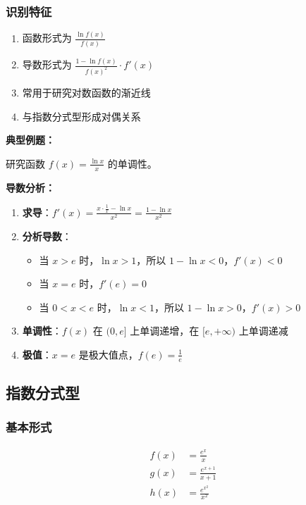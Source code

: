 \documentclass[a4paper,11pt]{ctexrep}
\newcommand{\exampleicon}{\ModeBadge[highlight]{例题}}
\newcommand{\analysisicon}{\ModeBadge[secondary]{分析}}
\theoremstyle{definition}
\begin{document}
\subsubsection{识别特征}

\begin{tipbox}[对数分式型识别要点]
\begin{enumerate}
    \item 函数形式为 $\frac{\ln f(x)}{f(x)}$
    \item 导数形式为 $\frac{1 - \ln f(x)}{f(x)^2} \cdot f'(x)$
    \item 常用于研究对数函数的渐近线
    \item 与指数分式型形成对偶关系
\end{enumerate}
\end{tipbox}

\exampleicon \textbf{典型例题：}

研究函数 $f(x) = \frac{\ln x}{x}$ 的单调性。

\analysisicon \textbf{导数分析：}

\begin{enumerate}
    \item \textbf{求导}：$f'(x) = \frac{x \cdot \frac{1}{x} - \ln x}{x^2} = \frac{1 - \ln x}{x^2}$
    \item \textbf{分析导数}：
    \begin{itemize}
        \item 当 $x > e$ 时，$\ln x > 1$，所以 $1 - \ln x < 0$，$f'(x) < 0$
        \item 当 $x = e$ 时，$f'(e) = 0$
        \item 当 $0 < x < e$ 时，$\ln x < 1$，所以 $1 - \ln x > 0$，$f'(x) > 0$
    \end{itemize}
    \item \textbf{单调性}：$f(x)$ 在 $(0, e]$ 上单调递增，在 $[e, +\infty)$ 上单调递减
    \item \textbf{极值}：$x = e$ 是极大值点，$f(e) = \frac{1}{e}$
\end{enumerate}

\subsection{指数分式型}

\subsubsection{基本形式}

\begin{definitionbox}[指数分式型]
\begin{align}
f(x) &= \frac{e^x}{x} \\
g(x) &= \frac{e^{x+1}}{x+1} \\
h(x) &= \frac{e^{x^2}}{x^2}
\end{align}
\end{definitionbox}
\end{document}
